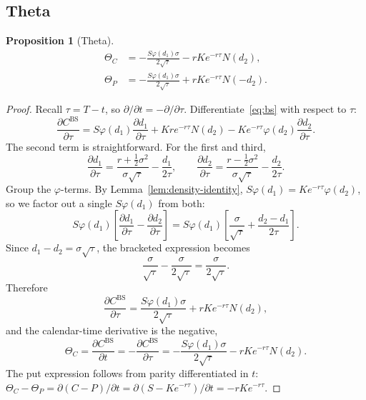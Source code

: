 \documentclass[11pt,a4paper]{article}
\theoremstyle{plain}
\newtheorem{proposition}[theorem]{Proposition}
\theoremstyle{definition}
\theoremstyle{remark}
\newcommand{\BS}{\mathrm{BS}}
\begin{document}
\subsection{Theta}

\begin{proposition}[Theta]
\label{prop:theta}
\begin{align*}
    \Theta_C
    &= -\frac{S \varphi(d_1) \sigma}{2 \sqrt{\tau}}
        - r K e^{-r\tau} N(d_2), \\
    \Theta_P
    &= -\frac{S \varphi(d_1) \sigma}{2 \sqrt{\tau}}
        + r K e^{-r\tau} N(-d_2).
\end{align*}
\end{proposition}

\begin{proof}
Recall \(\tau = T - t\), so \(\partial/\partial t = -\partial/\partial\tau\).
Differentiate~\eqref{eq:bs} with respect to \(\tau\):
\[
    \frac{\partial C^{\BS}}{\partial \tau}
    = S \varphi(d_1) \frac{\partial d_1}{\partial \tau}
        + K r e^{-r\tau} N(d_2)
        - K e^{-r\tau} \varphi(d_2) \frac{\partial d_2}{\partial \tau}.
\]
The second term is straightforward. For the first and third,
\[
    \frac{\partial d_1}{\partial \tau}
    = \frac{r + \tfrac{1}{2}\sigma^2}{\sigma\sqrt{\tau}}
        - \frac{d_1}{2\tau},
    \qquad
    \frac{\partial d_2}{\partial \tau}
    = \frac{r - \tfrac{1}{2}\sigma^2}{\sigma\sqrt{\tau}}
        - \frac{d_2}{2\tau}.
\]
Group the \(\varphi\)-terms. By Lemma~\ref{lem:density-identity},
\(S\varphi(d_1) = K e^{-r\tau}\varphi(d_2)\), so we factor out a single
\(S\varphi(d_1)\) from both:
\[
    S\varphi(d_1)\!\left[
        \frac{\partial d_1}{\partial\tau} - \frac{\partial d_2}{\partial\tau}
    \right]
    = S\varphi(d_1)\!\left[
        \frac{\sigma}{\sqrt{\tau}}
        + \frac{d_2 - d_1}{2\tau}
    \right].
\]
Since \(d_1 - d_2 = \sigma\sqrt{\tau}\), the bracketed expression
becomes
\[
    \frac{\sigma}{\sqrt{\tau}} - \frac{\sigma}{2\sqrt{\tau}}
    = \frac{\sigma}{2\sqrt{\tau}}.
\]
Therefore
\[
    \frac{\partial C^{\BS}}{\partial \tau}
    = \frac{S\varphi(d_1) \sigma}{2 \sqrt{\tau}} + r K e^{-r\tau} N(d_2),
\]
and the calendar-time derivative is the negative,
\[
    \Theta_C
    = \frac{\partial C^{\BS}}{\partial t}
    = -\frac{\partial C^{\BS}}{\partial \tau}
    = -\frac{S\varphi(d_1) \sigma}{2 \sqrt{\tau}} - r K e^{-r\tau} N(d_2).
\]
The put expression follows from parity differentiated in \(t\):
\(\Theta_C - \Theta_P = \partial(C - P)/\partial t
= \partial(S - K e^{-r\tau})/\partial t = -r K e^{-r\tau}\).
\end{proof}
\end{document}
